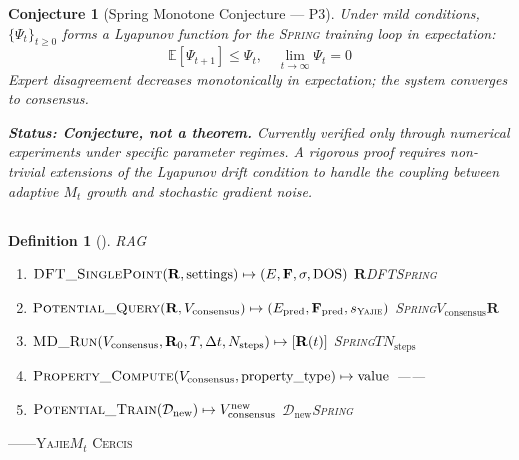 \documentclass[12pt,a4paper]{article}
\newtheorem{definition}[theorem]{Definition}
\newtheorem{conjecture}[theorem]{Conjecture}
\theoremstyle{remark}
\newcommand{\D}{\mathcal{D}}
\newcommand{\Spring}{\textsc{Spring}}
\newcommand{\Yajie}{\textsc{Yajie}}
\newcommand{\Cercis}{\textsc{Cercis}}
\newcommand{\Lyap}{\ensuremath{\Psi}}
\begin{document}
\begin{conjecture}[Spring Monotone Conjecture — P3]\label{conj:P3}
Under mild conditions, $\{\Lyap_t\}_{t \geq 0}$ forms a Lyapunov function for the \Spring{} training loop in expectation:
\begin{equation}
    \mathbb{E}[\Lyap_{t+1}] \leq \Lyap_t, \quad \lim_{t \to \infty} \Lyap_t = 0
\end{equation}
Expert disagreement decreases monotonically in expectation; the system converges to consensus.

\textbf{Status: Conjecture, not a theorem.} Currently verified only through numerical experiments under specific parameter regimes. A rigorous proof requires non-trivial extensions of the Lyapunov drift condition to handle the coupling between adaptive $M_t$ growth and stochastic gradient noise.
\end{conjecture}

\subsection{}



\begin{definition}[]\label{def:physics_interface}
RAG
\begin{enumerate}[label=(\roman*),itemsep=2pt]
    \item $\textsc{DFT\_SinglePoint}(\mathbf{R}, \text{settings}) \mapsto (E, \mathbf{F}, \sigma, \text{DOS})$
    $\mathbf{R}$DFT\Spring{}
    \item $\textsc{Potential\_Query}(\mathbf{R}, V_{\text{consensus}}) \mapsto (E_{\text{pred}}, \mathbf{F}_{\text{pred}}, s_{\Yajie})$
    \Spring{}$V_{\text{consensus}}$$\mathbf{R}$
    \item $\textsc{MD\_Run}(V_{\text{consensus}}, \mathbf{R}_0, T, \Delta t, N_{\text{steps}}) \mapsto [\mathbf{R}(t)]$
    \Spring{}$T$$N_{\text{steps}}$
    \item $\textsc{Property\_Compute}(V_{\text{consensus}}, \text{property\_type}) \mapsto \text{value}$
    ——
    \item $\textsc{Potential\_Train}(\D_{\text{new}}) \mapsto V_{\text{consensus}}^{\text{new}}$
    $\D_{\text{new}}$\Spring{}
\end{enumerate}
\end{definition}

——\Yajie{}$M_t$
\Cercis{}\textbf{}

\subsection{}
\end{document}
